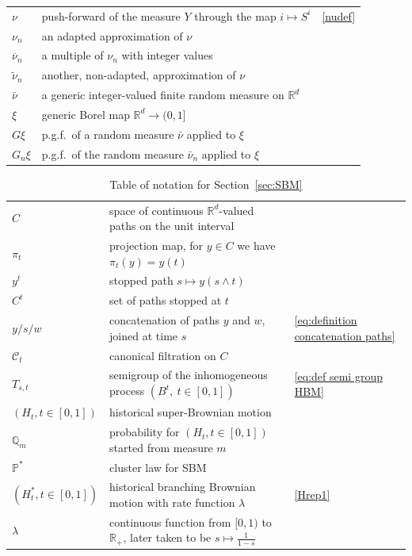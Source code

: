\documentclass[12pt]{article}
\numberwithin{theorem}{section}
\theoremstyle{def}
\numberwithin{equation}{section}
\renewcommand{\P}{\mathbb{P}}
\newcommand{\R}{\mathbb{R}}
\newcommand{\Q}{\mathbb{Q}}
\newcommand{\cC}{\mathcal C}
\begin{document}
{\begin{center}
\begin{longtable}{|l|l|l|}
		\hline
		$\nu$  & push-forward of the measure $Y$ through the map $i \mapsto S^i$ & \eqref{nudef} \\
		$\nu_n$  & an adapted approximation of $\nu$ & \\
		$\overline{\nu}_n$  & a multiple of $\nu_n$ with integer values & \\
		$\tilde \nu_n$  & another, non-adapted, approximation of $\nu$ & \\
		$\bar{\nu}$ & a generic integer-valued finite random measure on $\R^d$ & \\
		\hline
		$\xi$ & generic Borel map $\R^d \rightarrow (0,1]$ &\\
		$G\xi$ & p.g.f.\ of a random measure $\bar{\nu}$ applied to $\xi$ &  \\
		$G_n\xi$ & p.g.f.\ of the random measure $\bar{\nu}_n$ applied to $\xi$& \\
		\hline
\end{longtable}
\end{center}
\begin{table}[htbp]\caption{Table of notation for Section~\ref{sec:SBM}}
	\begin{tabular}{|l| l |l |}
		\hline
		$C$ & space of continuous $\R^d$-valued paths on the unit interval& \\
		$\pi_t$ & projection map, for $y\in C$ we have $\pi_t(y)=y(t)$& \\
		$y^t$ & stopped path $s\mapsto y(s\wedge t)$& \\
		$C^t$ & set of paths stopped at $t$ & \\
		$y/s/w$ & concatenation of paths $y$ and $w$, joined at time $s$& \eqref{eq:definition concatenation paths}\\
		$\cC_t$ & canonical filtration on $C$ & \\
		$T_{s,t}$ & semigroup of the inhomogeneous process $(B^t, \ t\in[0,1])$& \eqref{eq:def semi group HBM}\\
		$(H_t,t\in[0,1])$ & historical super-Brownian motion& \\
		$\Q_m$ & probability for $(H_t,t\in[0,1])$ started from measure $m$& \\
		$\P^*$ & cluster law for SBM & \\
		$(H_t^*,t\in[0,1])$  & historical branching Brownian motion with rate function $\lambda$ & \eqref{Hrep1}\\
		$\lambda$ & continuous function from $[0,1)$ to $\R_+$, later taken to be $s\mapsto\frac{1}{1-s}$ & \\

\end{tabular}
\end{table}}
\end{document}

